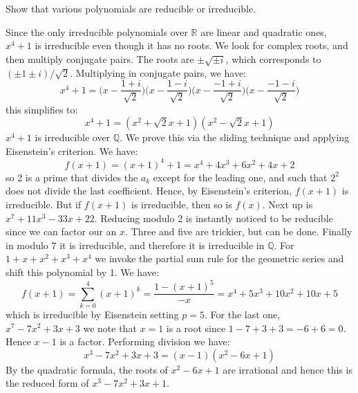 \documentclass{article}                                                        %
\begin{document}
        \begin{problem}
            Show that various polynomials are reducible or irreducible.
        \end{problem}
        \begin{solution}
            Since the only irreducible polynomials over $\mathbb{R}$ are linear
            and quadratic ones, $x^{4}+1$ is irreducible even though it has no
            roots. We look for complex roots, and then multiply conjugate pairs.
            The roots are $\pm\sqrt{\pm{i}}$, which corresponds to
            $(\pm{1}\pm{i})/\sqrt{2}$. Multiplying in conjugate pairs, we have:
            \begin{equation}
                x^{4}+1=\big(x-\frac{1+i}{\sqrt{2}}\big)
                        \big(x-\frac{1-i}{\sqrt{2}}\big)
                        \big(x-\frac{\minus{1}+i}{\sqrt{2}}\big)
                        \big(x-\frac{\minus{1}-i}{\sqrt{2}}\big)
            \end{equation}
            this simplifies to:
            \begin{equation}
                x^{4}+1=(x^{2}+\sqrt{2}x+1)(x^{2}-\sqrt{2}x+1)
            \end{equation}
            $x^{4}+1$ is irreducible over $\mathbb{Q}$. We prove this via the
            sliding technique and applying Eisenstein's criterion. We have:
            \begin{equation}
                f(x+1)=(x+1)^{4}+1
                =x^{4}+4x^{3}+6x^{2}+4x+2
            \end{equation}
            so 2 is a prime that divides the $a_{k}$ except for the leading one,
            and such that $2^{2}$ does not divide the last coefficient.
            Hence, by Eisenstein's criterion, $f(x+1)$ is irreducible. But if
            $f(x+1)$ is irreducible, then so is $f(x)$. Next up is
            $x^{7}+11x^{3}-33x+22$. Reducing modulo 2 is instantly noticed to be
            reducible since we can factor our an $x$. Three and five are
            trickier, but can be done. Finally in modulo 7 it is irreducible,
            and therefore it is irreducible in $\mathbb{Q}$. For
            $1+x+x^{2}+x^{3}+x^{4}$ we invoke the partial sum rule for the
            geometric series and shift this polynomial by 1. We have:
            \begin{equation}
                f(x+1)=\sum_{k=0}^{4}(x+1)^{k}=\frac{1-(x+1)^{5}}{\minus{x}}
                =x^{4}+5x^{3}+10x^{2}+10x+5
            \end{equation}
            which is irreducible by Eisenstein setting $p=5$. For the last one,
            $x^{7}-7x^{2}+3x+3$ we note that $x=1$ is a root since
            $1-7+3+3=\minus{6}+6=0$. Hence $x-1$ is a factor. Performing
            division we have:
            \begin{equation}
                x^{3}-7x^{2}+3x+3=(x-1)(x^{2}-6x+1)
            \end{equation}
            By the quadratic formula, the roots of $x^{2}-6x+1$ are irrational
            and hence this is the reduced form of $x^{3}-7x^{2}+3x+1$.
        \end{solution}
\end{document}
